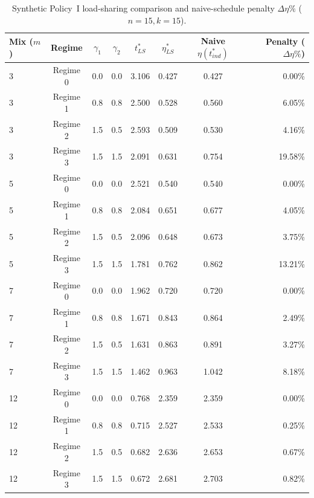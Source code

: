 \documentclass[10pt,a4paper]{article}
\begin{document}
\begin{table}[htbp]
\centering
\footnotesize
\caption{Synthetic Policy~I load-sharing comparison and naive-schedule penalty $\Delta\eta\%$ ($n = 15, k = 15$).}
\label{tab:S2}
\begin{tabular*}{\textwidth}{@{\extracolsep{\fill}}lccccccr@{}}
\toprule
Mix ($m$) & Regime & $\gamma_1$ & $\gamma_2$ & $t_{LS}^*$ & $\eta_{LS}^*$ & Naive $\eta(t_{ind}^*)$ & Penalty ($\Delta\eta\%$) \\
\midrule
3  & Regime 0 & 0.0 & 0.0 & 3.106 & 0.427 & 0.427 & 0.00\% \\
3  & Regime 1 & 0.8 & 0.8 & 2.500 & 0.528 & 0.560 & 6.05\% \\
3  & Regime 2 & 1.5 & 0.5 & 2.593 & 0.509 & 0.530 & 4.16\% \\
3  & Regime 3 & 1.5 & 1.5 & 2.091 & 0.631 & 0.754 & 19.58\% \\
\midrule
5  & Regime 0 & 0.0 & 0.0 & 2.521 & 0.540 & 0.540 & 0.00\% \\
5  & Regime 1 & 0.8 & 0.8 & 2.084 & 0.651 & 0.677 & 4.05\% \\
5  & Regime 2 & 1.5 & 0.5 & 2.096 & 0.648 & 0.673 & 3.75\% \\
5  & Regime 3 & 1.5 & 1.5 & 1.781 & 0.762 & 0.862 & 13.21\% \\
\midrule
7  & Regime 0 & 0.0 & 0.0 & 1.962 & 0.720 & 0.720 & 0.00\% \\
7  & Regime 1 & 0.8 & 0.8 & 1.671 & 0.843 & 0.864 & 2.49\% \\
7  & Regime 2 & 1.5 & 0.5 & 1.631 & 0.863 & 0.891 & 3.27\% \\
7  & Regime 3 & 1.5 & 1.5 & 1.462 & 0.963 & 1.042 & 8.18\% \\
\midrule
12 & Regime 0 & 0.0 & 0.0 & 0.768 & 2.359 & 2.359 & 0.00\% \\
12 & Regime 1 & 0.8 & 0.8 & 0.715 & 2.527 & 2.533 & 0.25\% \\
12 & Regime 2 & 1.5 & 0.5 & 0.682 & 2.636 & 2.653 & 0.67\% \\
12 & Regime 3 & 1.5 & 1.5 & 0.672 & 2.681 & 2.703 & 0.82\% \\
\bottomrule
\end{tabular*}
\end{table}
\end{document}
